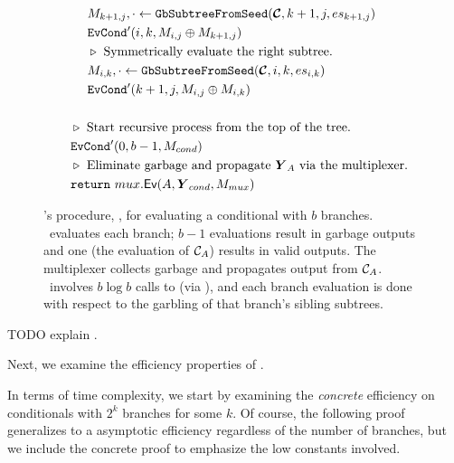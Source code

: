 \begin{figure}
\begin{align*}
    &~~~~~~\mat_{k+1,j}, \cdot \gets \gbtree(\vec{\cir}, k+1, j, es_{k+1, j})\\
    &~~~~~~\evcond'(i, k, \mat_{i, j} \oplus \mat_{k+1,j})\\
    &~~~~~~\codecomment{Symmetrically evaluate the right subtree.}\\
    &~~~~~~\mat_{i, k}, \cdot \gets \gbtree(\vec{\cir}, i, k, es_{i,k})\\
    &~~~~~~\evcond'(k+1, j, \mat_{i, j} \oplus \mat_{i, k})\\
    \\
    &~~\codecomment{Start recursive process from the top of the tree.}\\
    &~~\evcond'(0, b-1, M_{cond})\\
    &~~\codecomment{Eliminate garbage and propagate $\vec{Y}_\aid$ via
    the multiplexer.}\\
    &~~\creturn~\evmux(\aid, \vec{Y}_{cond}, M_{mux})
  \end{align*}
  \caption{%
    \E's procedure, \evcond, for evaluating a conditional with $b$ branches.
    \evcond\ evaluates each branch; $b-1$ evaluations
    result in garbage outputs and one (the evaluation of
    $\mathcal C_{A}$) results in valid outputs.
    The multiplexer collects garbage and propagates output from
    $\mathcal C_{A}$.
    \evcond\ involves $b \log b$ calls to \gGb (via \gbtree), and each
    branch evaluation is done with respect to the garbling of that
    branch's sibling subtrees.
  }
\end{figure}

TODO explain \evcond.


Next, we examine the efficiency properties of \evcond.

In terms of time complexity, we start by examining the \emph{concrete}
efficiency on conditionals with $2^k$ branches for some $k$.
%
Of course, the following proof generalizes to a asymptotic efficiency
regardless of the number of branches, but we include the concrete
proof to emphasize the low constants involved.

